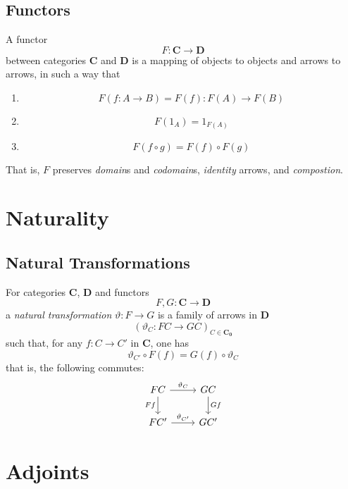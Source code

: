 \documentclass{article}
\begin{document}
\subsection{Functors}
\begin{defn}[{\cite{AS10}}]
A functor
\[
F: \mathbf{C} \rightarrow \mathbf{D}
\]
between categories $\mathbf{C}$ and $\mathbf{D}$ is a mapping of objects to objects and arrows to arrows,
in such a way that
\begin{enumerate}
\item
\[
F(f:A \rightarrow B) = F(f):F(A) \rightarrow F(B)
\]
\item
\[
F(1_{A}) = 1_{F(A)}
\]
\item
\[
F(f \circ g) = F(f) \circ F(g)
\]
\end{enumerate}
That is, $F$ preserves \emph{domain}s and \emph{codomain}s, \emph{identity} arrows, and \emph{compostion}.
\end{defn}

\section{Naturality}
\subsection{Natural Transformations}
\begin{defn}[{\cite{AS10}}]
For categories $\mathbf{C}$, $\mathbf{D}$ and functors
\[
F,G: \mathbf{C} \rightarrow \mathbf{D}
\]
a \emph{natural transformation} $\vartheta: F \rightarrow G$ is a family of arrows in $\mathbf{D}$
\[
(\vartheta_{C}: FC \rightarrow GC)_{C \in \mathbf{C_0}}
\]
such that, for any $f: C \rightarrow C'$ in $\mathbf{C}$, one has
\[
\vartheta_{C'} \circ F(f) = G(f) \circ \vartheta_{C}
\]
that is, the following commutes:
\[
\begin{tikzcd}
FC \arrow[r, "\vartheta_{C}"] \arrow[d, "Ff"'] & GC \arrow[d, "Gf"] \\
FC' \arrow[r, "\vartheta_{C'}"] & GC'
\end{tikzcd}
\]
\end{defn}

\section{Adjoints}
\end{document}
